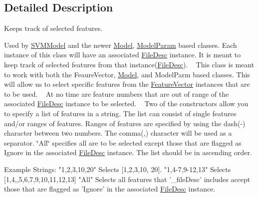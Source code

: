 \subsection{Detailed Description}
Keeps track of selected features. 

Used by \hyperlink{class_k_k_m_l_l_1_1_s_v_m_model}{S\+V\+M\+Model} and the newer \textquotesingle{}\hyperlink{class_k_k_m_l_l_1_1_model}{Model}\textquotesingle{}, \textquotesingle{}\hyperlink{class_k_k_m_l_l_1_1_model_param}{Model\+Param}\textquotesingle{} based classes. Each instance of this class will have an associated \textquotesingle{}\hyperlink{class_k_k_m_l_l_1_1_file_desc}{File\+Desc}\textquotesingle{} instance. It is meant to keep track of selected features from that instance(\textquotesingle{}\hyperlink{class_k_k_m_l_l_1_1_file_desc}{File\+Desc}\textquotesingle{}). ~\newline
 This class is meant to work with both the Feaure\+Vector, \hyperlink{class_k_k_m_l_l_1_1_model}{Model}, and Model\+Parm based classes. This will allow us to select specific features from the \hyperlink{class_k_k_m_l_l_1_1_feature_vector}{Feature\+Vector} instances that are to be used. ~\newline
 At no time are feature numbers that are out of range of the associated \hyperlink{class_k_k_m_l_l_1_1_file_desc}{File\+Desc} instance to be selected. ~\newline
 Two of the constructors allow you to specify a list of features in a string. The list can consist of single features and/or ranges of features. Ranges of features are specified by using the dash(\textquotesingle{}-\/\textquotesingle{}) character between two numbers. The comma(\textquotesingle{},\textquotesingle{}) character will be used as a separator. \char`\"{}\+All\char`\"{} specifies all are to be selected except those that are flagged as \textquotesingle{}Ignore\textquotesingle{} in the associated \hyperlink{class_k_k_m_l_l_1_1_file_desc}{File\+Desc} instance. The list should be in ascending order.


\begin{DoxyCode}
Example Strings:
  \textcolor{stringliteral}{"1,2,3,10,20"}    Selects [1,2,3,10, 20].
  \textcolor{stringliteral}{"1,4-7,9-12,13"}  Selects [1,4,,5,6,7,9,10,11,12,13]
  \textcolor{stringliteral}{"All"}            Selects all features that \textcolor{stringliteral}{'\_fileDesc'} includes accept
                   those that are flagged as \textcolor{stringliteral}{'Ignore'} in the 
                   associated \hyperlink{class_k_k_m_l_l_1_1_feature_num_list_a8c887df1129ad7d3119c33549373b478}{FileDesc} instance.
\end{DoxyCode}


